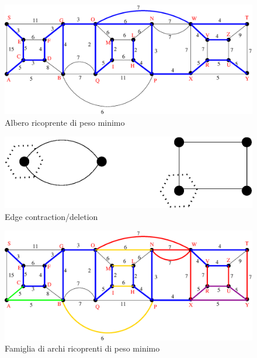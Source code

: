 \documentclass[12pt,a4paper,twoside]{article}
\theoremstyle{definition}
\theoremstyle{definition}
\theoremstyle{theorem}
\begin{document}
	\begin{figure}[h]
		\centering
		\includegraphics[width=\textwidth]{grafoend.eps}
		\caption{Albero ricoprente di peso minimo}\label{grafoend}
	\end{figure}
	\begin{figure}[h]
		\centering
		\includegraphics[width=\textwidth]{supernodi.eps}
		\caption{Edge contraction/deletion}\label{contr}
	\end{figure}
	\begin{figure}[h] 
		\centering
		\includegraphics[width=\textwidth]{famiglia.eps}
		\caption{Famiglia di archi ricoprenti di peso minimo}\label{fam}
	\end{figure}				
\end{document}
